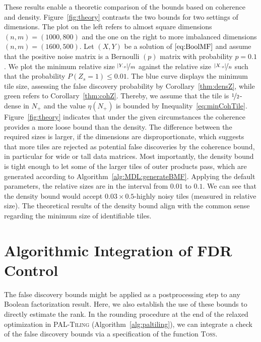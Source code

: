 These results enable a theoretic comparison of the bounds based on coherence and density. Figure~\ref{fig:theory} contrasts the two bounds for two settings of dimensions. The plot on the left refers to almost square dimensions $(n,m)=(1000,800)$ and the one on the right to more imbalanced dimensions $(n,m)=(1600,500)$. Let $(X,Y)$ be a solution of $\eqref{eq:BoolMF}$ and assume that the positive noise matrix is a Bernoulli $(p)$ matrix with probability $p=0.1$. We plot the minimum relative size $\nicefrac{|Y_{\cdot s}|}{m}$ against the relative size $\nicefrac{|X_{\cdot s}|}{n}$ such that the probability $P(Z_s=1)\leq 0.01$. The blue curve displays the minimum tile size, assessing the false discovery probability by Corollary~\ref{thm:densZ}, while green refers to Corollary~\ref{thm:cohZ}. Thereby, we assume that the tile is $\nicefrac{1}{2}$-dense in $N_+$ and the value $\eta(N_+)$ is bounded by Inequality~\eqref{eq:minCohTile}. Figure~\ref{fig:theory} indicates that under the given circumstances the coherence provides a more loose bound than the density. The difference between the required sizes is larger, if the dimensions are disproportionate, which suggests that more tiles are rejected as potential false discoveries by the coherence bound, in particular for wide or tall data matrices. Most importantly, the density bound is tight enough to let some of the larger tiles of outer products pass, which are generated according to Algorithm~\ref{alg:MDL:generateBMF}. Applying the default parameters, the relative sizes are in the interval from $0.01$ to $0.1$. We can see that the density bound would accept $0.03\times 0.5$-highly noisy tiles (measured in relative size). The theoretical results of the density bound align with the common sense regarding the minimum size of identifiable tiles.   
\section{Algorithmic Integration of FDR Control}\label{sec:TP:algorithmicIntegration}
The false discovery bounds might be applied as a postprocessing step to any Boolean factorization result. Here, we also establish the use of these bounds to directly estimate the rank.
In the rounding procedure at the end of the relaxed optimization in \textsc{PAL-Tiling} (Algorithm~\ref{alg:paltiling}), we can integrate a check of the false discovery bounds via a specification of the function \textsc{Toss}.
 

